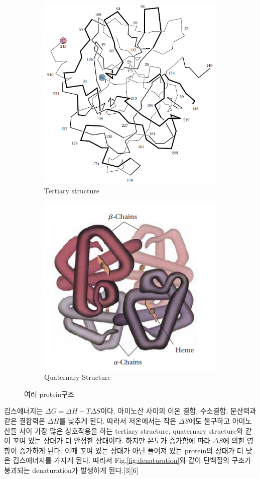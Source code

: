 \documentclass[%
 reprint,
 amsmath,amssymb,
 aps,
]{revtex4-2}
\begin{document}
\begin{figure}[htbp]
	\begin{subfigure}{0.4\textwidth}
		\includegraphics[width = 0.5\linewidth]{Third.png}%
		\caption{\label{fig:Third}Tertiary structure}
	\end{subfigure}
	\begin{subfigure}{0.4\textwidth}
		\includegraphics[width = 0.5\linewidth]{Fourth.png}%
		\caption{\label{fig:Fourth}Quaternary Structure}
	\end{subfigure}
	\caption{\label{fig:Protein}여러 protein구조 }
\end{figure}

깁스에너지는 $\Delta G = \Delta H - T \Delta S$이다. 아미노산 사이의 이온 결합, 수소결합, 분산력과 같은 결합력은 $\Delta H$를 낮추게 된다. 따라서 저온에서는 작은 $\Delta S$에도 불구하고 아미노산들 사이 가장 많은 상호작용을 하는 tertiary structure,  quaternary structure와 같이 꼬여 있는 상태가 더 안정한 상태이다. 하지만 온도가 증가함에 따라 $\Delta S$에 의한 영향이 증가하게 된다. 이때 꼬여 있는 상태가 아닌 풀어져 있는 protein의 상태가 더 낮은 깁스에너지를 가지게 된다. 따라서 Fig.\ref{fig:denaturation}와 같이 단백질의 구조가 붕괴되는 denaturation가 발생하게 된다.[3][6]
\end{document}

